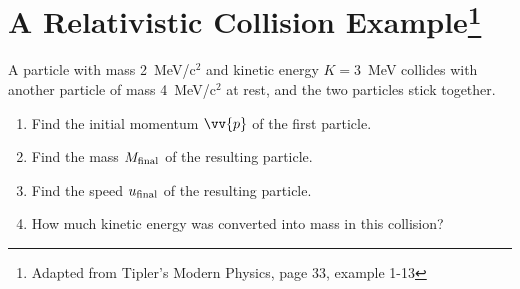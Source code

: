 \section{A Relativistic Collision Example\footnote{Adapted from Tipler's Modern Physics, page 33, example 1-13}}

\makelabheader %

\bigskip

A particle with mass 2~MeV/c$^2$ and kinetic energy $K=3$~MeV collides with another particle of mass 4~MeV/c$^2$ at rest, and the two particles stick together. 

\begin{enumerate}[wide]
\item Find the initial momentum $\vv{p}$ of the first particle. 
\answerspace{1.1in}

\item Find the mass $M_{\rm final}$ of the resulting particle.
\answerspace{1.1in}

\item Find the speed $u_{\rm final}$ of the resulting particle.
\answerspace{1.1in}

\item How much kinetic energy was converted into mass in this collision?
\answerspace{1.1in}

\end{enumerate}
